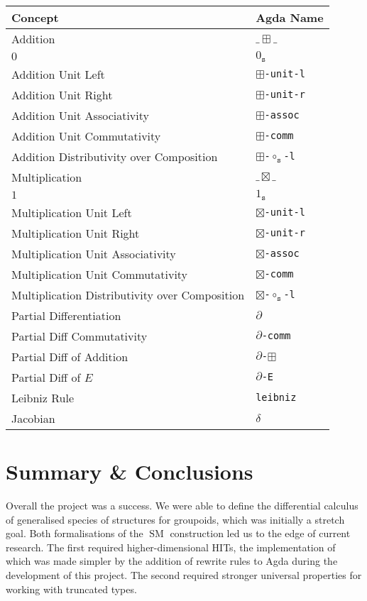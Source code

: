\documentclass[12pt, parskip, DIV=14]{scrbook}
\renewcommand{\circ}{\vysmwhtcircle}
\newcommand{\SM}{\operatorname{SM}}
\begin{document}
\begin{center}
\begin{tabular}{ll}
  Concept & Agda Name \\
  \hline
  Addition & $\_\boxplus\_$ \\
  $0$ & $0_\texttt{s}$ \\
  Addition Unit Left & \texttt{$\boxplus$-unit-l} \\
  Addition Unit Right & \texttt{$\boxplus$-unit-r} \\
  Addition Unit Associativity & \texttt{$\boxplus$-assoc} \\
  Addition Unit Commutativity & \texttt{$\boxplus$-comm} \\
  Addition Distributivity over Composition & \texttt{$\boxplus$-$\circ_\texttt{s}$-l} \\
  Multiplication & $\_\boxtimes\_$ \\
  $1$ & $1_\texttt{s}$ \\
  Multiplication Unit Left & \texttt{$\boxtimes$-unit-l} \\
  Multiplication Unit Right & \texttt{$\boxtimes$-unit-r} \\
  Multiplication Unit Associativity & \texttt{$\boxtimes$-assoc} \\
  Multiplication Unit Commutativity & \texttt{$\boxtimes$-comm} \\
  Multiplication Distributivity over Composition & \texttt{$\boxtimes$-$\circ_\texttt{s}$-l} \\
  Partial Differentiation & $\partial$ \\
  Partial Diff Commutativity & \texttt{$\partial$-comm} \\
  Partial Diff of Addition & \texttt{$\partial$-$\boxplus$} \\
  Partial Diff of $E$ & \texttt{$\partial$-E} \\
  Leibniz Rule & \texttt{leibniz} \\
  Jacobian & $\delta$ \\
\end{tabular}
\end{center}

\chapter{Summary \& Conclusions}

Overall the project was a success. We were able to define the differential calculus of generalised species of structures for groupoids, which was initially a stretch goal. Both formalisations of the $\SM$ construction led us to the edge of current research. The first required higher-dimensional HITs, the implementation of which was made simpler by the addition of rewrite rules to Agda during the development of this project. The second required stronger universal properties for working with truncated types.
\end{document}
